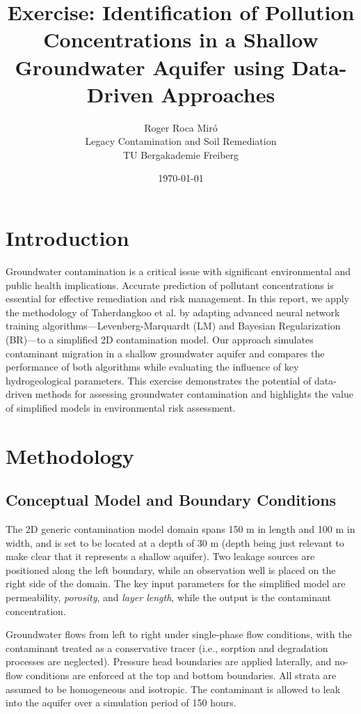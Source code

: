 \documentclass[10pt]{article}
\title{Exercise: Identification of Pollution Concentrations in a Shallow Groundwater Aquifer using Data-Driven Approaches}
\author{Roger Roca Miró \\ Legacy Contamination and Soil Remediation \\ TU Bergakademie Freiberg}
\date{\today}
\begin{document}
	
	\maketitle
	
	\section{Introduction}
	Groundwater contamination is a critical issue with significant environmental and public health implications. Accurate prediction of pollutant concentrations is essential for effective remediation and risk management. In this report, we apply the methodology of Taherdangkoo et al. \cite{taherdangkoo2020} by adapting advanced neural network training algorithms—Levenberg-Marquardt (LM) and Bayesian Regularization (BR)—to a simplified 2D contamination model. Our approach simulates contaminant migration in a shallow groundwater aquifer and compares the performance of both algorithms while evaluating the influence of key hydrogeological parameters. This exercise demonstrates the potential of data-driven methods for assessing groundwater contamination and highlights the value of simplified models in environmental risk assessment.
	
	\section{Methodology}
	\subsection{Conceptual Model and Boundary Conditions}
	The 2D generic contamination model domain spans 150 m in length and 100 m in width, and is set to be located at a depth of 30 m (depth being just relevant to make clear that it represents a shallow aquifer). Two leakage sources are positioned along the left boundary, while an observation well is placed on the right side of the domain. The key input parameters for the simplified model are permeability, \textit{porosity}, and \textit{layer length}, while the output is the contaminant concentration.
	
	Groundwater flows from left to right under single-phase flow conditions, with the contaminant treated as a conservative tracer (i.e., sorption and degradation processes are neglected). Pressure head boundaries are applied laterally, and no-flow conditions are enforced at the top and bottom boundaries. All strata are assumed to be homogeneous and isotropic.
	The contaminant is allowed to leak into the aquifer over a simulation period of 150 hours.
	
\end{document}
